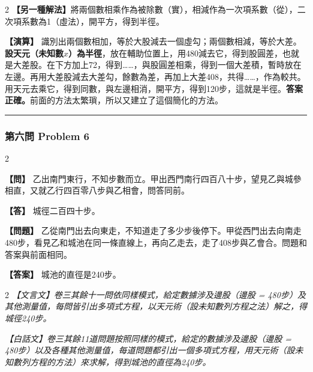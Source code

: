 \documentclass[11pt,a4paper]{article}
\newcommand{\wen}[1]{\par\noindent\textbf{\color{problemcolor}【問】} #1\par}
\newcommand{\da}[1]{\par\noindent\textbf{\color{problemcolor}【答】} #1\par}
\newcommand{\wenm}[1]{\par\noindent\textbf{\color{problemcolor}【問題】} #1\par}
\newcommand{\dam}[1]{\par\noindent\textbf{\color{problemcolor}【答案】} #1\par}
\newcommand{\caom}[1]{\par\noindent\textbf{\color{problemcolor}【演算】} #1\par}
\begin{document}
\begin{paracol}{2}
\vspace{0.2cm}
\noindent\textbf{【另一種解法】}將兩個數相乘作為被除數（實），相減作為一次項系數（從），二次項系數為1（虛法），開平方，得到半徑。

\caom{識別出兩個數相加，等於大股減去一個虛勾；兩個數相減，等於大差。\textbf{設天元（未知數$x$）為半徑}，放在輔助位置上，用480減去它，得到股圓差，也就是大差股。在下方加上72，得到……，與股圓差相乘，得到一個大差積，暫時放在左邊。再用大差股減去大差勾，餘數為差，再加上大差408，共得……，作為較共。用天元去乘它，得到同數，與左邊相消，開平方，得到120步，這就是半徑。\textbf{答案正確。}前面的方法太繁瑣，所以又建立了這個簡化的方法。}
\end{paracol}

\vspace{0.5cm}
\noindent\textcolor{rulecolor}{\rule{\textwidth}{0.4pt}}

\subsubsection*{第六問 \quad Problem 6}

\begin{paracol}{2}
\wen{乙出南門東行，不知步數而立。甲出西門南行四百八十步，望見乙與城參相直，又就乙行四百零八步與乙相會，問答同前。}

\da{城徑二百四十步。}

\switchcolumn
\wenm{乙從南門出去向東走，不知道走了多少步後停下。甲從西門出去向南走480步，看見乙和城池在同一條直線上，再向乙走去，走了408步與乙會合。問題和答案與前面相同。}

\dam{城池的直徑是240步。}
\end{paracol}

\vspace{0.5cm}

\begin{paracol}{2}
\textit{【文言文】卷三其餘十一問依同樣模式，給定數據涉及邊股（邊股 = 480步）及其他測量值，每問皆引出多項式方程，以天元術（設未知數列方程之法）解之，得城徑240步。}

\switchcolumn
\textit{【白話文】卷三其餘11道問題按照同樣的模式，給定的數據涉及邊股（邊股 = 480步）以及各種其他測量值，每道問題都引出一個多項式方程，用天元術（設未知數列方程的方法）來求解，得到城池的直徑為240步。}
\end{paracol}

\newpage

\end{document}
